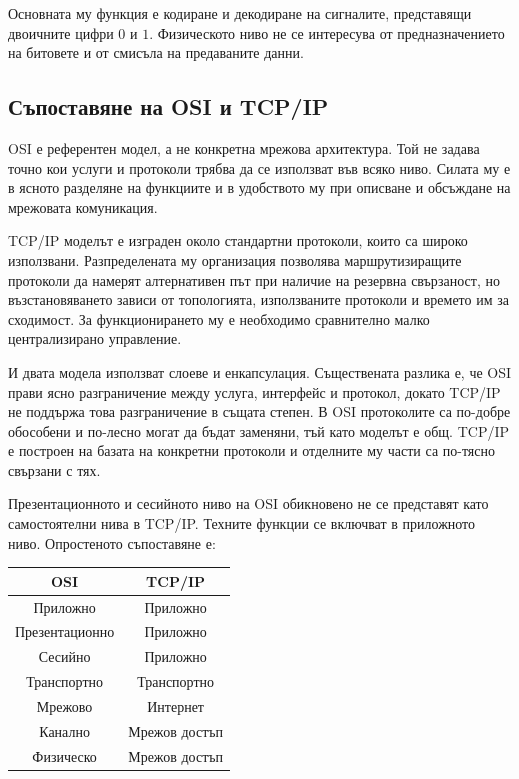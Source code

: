 Основната му функция е кодиране и декодиране на сигналите, представящи двоичните цифри $0$ и $1$. Физическото ниво не се интересува от предназначението на битовете и от смисъла на предаваните данни.

\subsection{Съпоставяне на OSI и TCP/IP}\label{s:13.2.3}

OSI е референтен модел, а не конкретна мрежова архитектура. Той не задава точно кои услуги и протоколи трябва да се използват във всяко ниво. Силата му е в ясното разделяне на функциите и в удобството му при описване и обсъждане на мрежовата комуникация.

TCP/IP моделът е изграден около стандартни протоколи, които са широко използвани. Разпределената му организация позволява маршрутизиращите протоколи да намерят алтернативен път при наличие на резервна свързаност, но възстановяването зависи от топологията, използваните протоколи и времето им за сходимост. За функционирането му е необходимо сравнително малко централизирано управление.

И двата модела използват слоеве и енкапсулация. Съществената разлика е, че OSI прави ясно разграничение между услуга, интерфейс и протокол, докато TCP/IP не поддържа това разграничение в същата степен. В OSI протоколите са по-добре обособени и по-лесно могат да бъдат заменяни, тъй като моделът е общ. TCP/IP е построен на базата на конкретни протоколи и отделните му части са по-тясно свързани с тях.

Презентационното и сесийното ниво на OSI обикновено не се представят като самостоятелни нива в TCP/IP. Техните функции се включват в приложното ниво. Опростеното съпоставяне е:

\begin{center}
\begin{tabular}{|c|c|}
\hline
\textbf{OSI} & \textbf{TCP/IP} \\
\hline
Приложно & Приложно \\
\hline
Презентационно & Приложно \\
\hline
Сесийно & Приложно \\
\hline
Транспортно & Транспортно \\
\hline
Мрежово & Интернет \\
\hline
Канално & Мрежов достъп \\
\hline
Физическо & Мрежов достъп \\
\hline
\end{tabular}
\end{center}

